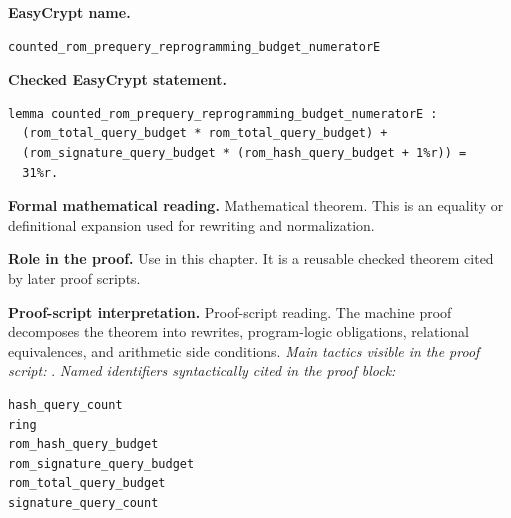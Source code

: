 \begin{formaltheorem}
\noindent\textbf{EasyCrypt name.}
\begin{lstlisting}[language=EasyCrypt,basicstyle=\ttfamily\scriptsize]
counted_rom_prequery_reprogramming_budget_numeratorE
\end{lstlisting}
\noindent\textbf{Checked EasyCrypt statement.}
\begin{lstlisting}[language=EasyCrypt,basicstyle=\ttfamily\scriptsize]
lemma counted_rom_prequery_reprogramming_budget_numeratorE :
  (rom_total_query_budget * rom_total_query_budget) +
  (rom_signature_query_budget * (rom_hash_query_budget + 1%r)) =
  31%r.
\end{lstlisting}
\noindent\textbf{Formal mathematical reading.}
Mathematical theorem. This is an equality or definitional expansion used for rewriting and normalization.

\noindent\textbf{Role in the proof.}
Use in this chapter. It is a reusable checked theorem cited by later proof scripts.

\noindent\textbf{Proof-script interpretation.}
Proof-script reading. The machine proof decomposes the theorem into rewrites, program-logic obligations, relational equivalences, and arithmetic side conditions.
\emph{Main tactics visible in the proof script:} .
\emph{Named identifiers syntactically cited in the proof block:}
\begin{lstlisting}[language=EasyCrypt,basicstyle=\ttfamily\scriptsize]
hash_query_count
ring
rom_hash_query_budget
rom_signature_query_budget
rom_total_query_budget
signature_query_count
\end{lstlisting}

\end{formaltheorem}


